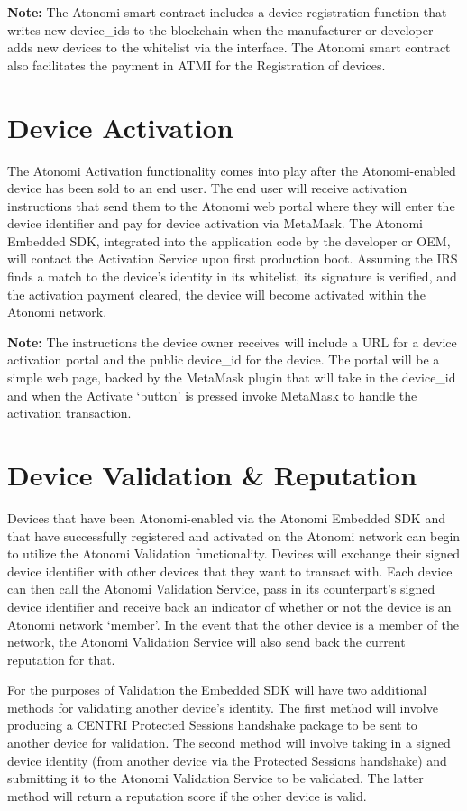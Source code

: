 \textbf{Note:} The Atonomi smart contract includes a device registration
function that writes
new device_ids to the blockchain when the manufacturer or developer adds new
devices to the whitelist via the interface. The Atonomi smart contract also
facilitates the payment in ATMI for the Registration of devices.


\section{Device Activation}
The Atonomi Activation functionality comes into play after the Atonomi-enabled
device has been sold to an end user. The end user will receive activation
instructions that send them to the Atonomi web portal where they will enter the
device identifier and pay for device activation via MetaMask. The Atonomi
Embedded SDK, integrated into the application code by the developer or OEM,
will contact the Activation Service upon first production boot. Assuming the
IRS finds a match to the device's identity in its whitelist, its signature is
verified, and the activation payment cleared, the device will become activated
within the Atonomi network.

\textbf{Note:} The instructions the device owner receives will include a URL
for a device activation portal and the public device_id for the device. The
portal will be a simple web page, backed by the MetaMask plugin that will take
in the device_id and when the Activate `button' is pressed invoke MetaMask to
handle the activation transaction.


\section{Device Validation \&{} Reputation}
Devices that have been Atonomi-enabled via the Atonomi Embedded SDK and that
have successfully registered and activated on the Atonomi network can begin to
utilize the Atonomi Validation functionality. Devices will exchange their
signed device identifier with other devices that they want to transact with.
Each device can then call the Atonomi Validation Service, pass in its
counterpart's signed device identifier and receive back an indicator of
whether or not the device is an Atonomi network `member'. In the event
that the other device is a member of the network, the Atonomi Validation
Service will also send back the current reputation for that.

For the purposes of Validation the Embedded SDK will have two
additional methods for validating another device's identity. The first
method will involve producing a CENTRI Protected Sessions handshake package
to be sent to another device for validation. The second method will involve
taking in a signed device identity (from another device via the Protected
Sessions handshake) and submitting it to the Atonomi Validation Service
to be validated. The latter method will return a reputation score if the
other device is valid.

